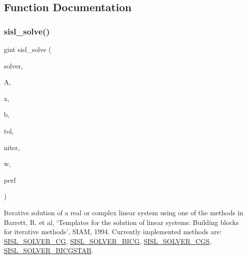\subsection{Function Documentation}
\mbox{\label{group__solver_gaf061c27d5085f572fe1701570cf3bac9}} 
\subsubsection{\texorpdfstring{sisl\+\_\+solve()}{sisl\_solve()}}
{\footnotesize\ttfamily gint sisl\+\_\+solve (\begin{DoxyParamCaption}\item[{\mbox{\hyperlink{group__solver_ga1db83bd06f9de0d0a3375f66a57d8f7b}{sisl\+\_\+solver\+\_\+t}}}]{solver,  }\item[{\mbox{\hyperlink{group__matrix_gad147923587b355644defb9bfbf981740}{sisl\+\_\+matrix\+\_\+t}} $\ast$}]{A,  }\item[{\mbox{\hyperlink{group__vector_gacbac585492f5005f05f0c0b8463039be}{sisl\+\_\+vector\+\_\+t}} $\ast$}]{x,  }\item[{\mbox{\hyperlink{group__vector_gacbac585492f5005f05f0c0b8463039be}{sisl\+\_\+vector\+\_\+t}} $\ast$}]{b,  }\item[{gdouble}]{tol,  }\item[{gint}]{niter,  }\item[{sisl\+\_\+solver\+\_\+workspace\+\_\+t $\ast$}]{w,  }\item[{sisl\+\_\+solver\+\_\+performance\+\_\+t $\ast$}]{perf }\end{DoxyParamCaption})}

Iterative solution of a real or complex linear system using one of the methods in Barrett, R. et al, `Templates for the solution of linear systems\+: Building blocks for iterative methods', S\+I\+AM, 1994. Currently implemented methods are\+: \mbox{\hyperlink{group__solver_gga1db83bd06f9de0d0a3375f66a57d8f7ba6369fa024759d2fe43e445d21418f800}{S\+I\+S\+L\+\_\+\+S\+O\+L\+V\+E\+R\+\_\+\+CG}}, \mbox{\hyperlink{group__solver_gga1db83bd06f9de0d0a3375f66a57d8f7bad4691ec8750fb37804dc951a10f9f478}{S\+I\+S\+L\+\_\+\+S\+O\+L\+V\+E\+R\+\_\+\+B\+I\+CG}}, \mbox{\hyperlink{group__solver_gga1db83bd06f9de0d0a3375f66a57d8f7bad357eb5b0c150fd54e80fb3ea5377c62}{S\+I\+S\+L\+\_\+\+S\+O\+L\+V\+E\+R\+\_\+\+C\+GS}}, \mbox{\hyperlink{group__solver_gga1db83bd06f9de0d0a3375f66a57d8f7baeb12981af5f7a411ef4bce95839a490e}{S\+I\+S\+L\+\_\+\+S\+O\+L\+V\+E\+R\+\_\+\+B\+I\+C\+G\+S\+T\+AB}}.


